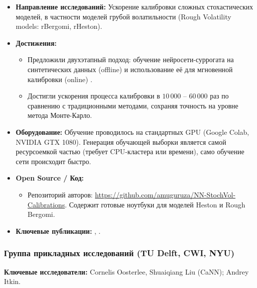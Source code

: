 \begin{itemize}
    \item \textbf{Направление исследований:} Ускорение калибровки сложных стохастических моделей, в частности моделей грубой волатильности (Rough Volatility models: rBergomi, rHeston).
    \item \textbf{Достижения:}
    \begin{itemize}
        \item Предложили двухэтапный подход: обучение нейросети-суррогата на синтетических данных (offline) и использование её для мгновенной калибровки (online) \cite{Horvath2019, Bayer2019}.
        \item Достигли ускорения процесса калибровки в $10\,000$ -- $60\,000$ раз по сравнению с традиционными методами, сохраняя точность на уровне метода Монте-Карло.
    \end{itemize}
    \item \textbf{Оборудование:} Обучение проводилось на стандартных GPU (Google Colab, NVIDIA GTX 1080). Генерация обучающей выборки является самой ресурсоемкой частью (требует CPU-кластера или времени), само обучение сети происходит быстро.
    \item \textbf{Open Source / Код:}
    \begin{itemize}
        \item Репозиторий авторов: \url{https://github.com/amuguruza/NN-StochVol-Calibrations}. Содержит готовые ноутбуки для моделей Heston и Rough Bergomi.
    \end{itemize}
    \item \textbf{Ключевые публикации:} \cite{Horvath2019}, \cite{Bayer2019}.
\end{itemize}

\subsubsection{Группа прикладных исследований (TU Delft, CWI, NYU)}
\textbf{Ключевые исследователи:} Cornelis Oosterlee, Shuaiqiang Liu (CaNN); Andrey Itkin.


